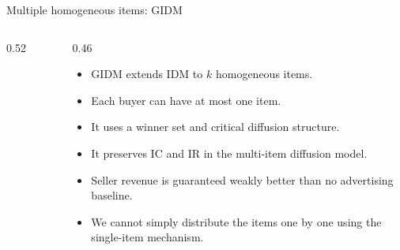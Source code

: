 \documentclass[10pt,aspectratio=169]{beamer}
\begin{document}
\begin{frame}{Multiple homogeneous items: GIDM}
\begin{columns}[T,totalwidth=\textwidth]
\begin{column}{0.52\textwidth}
\begin{figure}[htbp]
\end{figure}
\end{column}
\begin{column}{0.46\textwidth}
\begin{itemize}
    \item GIDM extends IDM to $k$ homogeneous items.
    \item Each buyer can have at most one item.
    \item It uses a winner set and critical diffusion structure.
    \item It preserves IC and IR in the multi-item diffusion model.
    \item Seller revenue is guaranteed weakly better than no advertising baseline.
    \item We cannot simply distribute the items one by one using the single-item mechanism.
\end{itemize}
\end{column}
\end{columns}
\end{frame}
\end{document}
